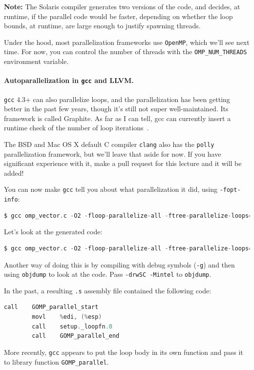 \documentclass[a4paper]{report}
\begin{document}
{\bf Note:} The Solaris compiler generates two versions of the code,
and decides, at runtime, if the parallel code would be faster, depending on
whether the loop bounds, at runtime, are large enough to justify spawning
threads.

Under the hood, most parallelization frameworks use {\tt OpenMP},
which we'll see next time. For now, you can control the number of
threads with the {\tt OMP\_NUM\_THREADS} environment variable.

\paragraph{Autoparallelization in {\tt gcc} and LLVM.}
{\tt gcc} 4.3+ can also parallelize loops, and the parallelization has
been getting better in the past few years, though it's still not super
well-maintained. Its framework is called Graphite. As far as I can
tell, gcc can currently insert a runtime check of the number of loop
iterations~\cite{autopar}.

The BSD and Mac OS X default C compiler {\tt clang} also has the {\tt polly} parallelization framework, but we'll leave that aside for now. If you have significant experience with it, make a pull request for this lecture and it will be added!

You can now make {\tt gcc} tell you about what parallelization it did, using {\tt -fopt-info}:
\begin{lstlisting}[language=C]
$ gcc omp_vector.c -O2 -floop-parallelize-all -ftree-parallelize-loops=2 -fopt-info
\end{lstlisting}
Let's look at the generated code:
\begin{lstlisting}[language=C]
$ gcc omp_vector.c -O2 -floop-parallelize-all -ftree-parallelize-loops=2 -fopt-info -S
\end{lstlisting}
Another way of doing this is by compiling with debug symbols ({\tt -g}) and then using {\tt objdump}
to look at the code. Pass {\tt -drwSC -Mintel} to {\tt objdump}.

In the past, a resulting {\tt .s} assembly file contained the following code:

\begin{lstlisting}[language=C]
        call    GOMP_parallel_start
        movl    %edi, (%esp)
        call    setup._loopfn.0
        call    GOMP_parallel_end
\end{lstlisting}
More recently, {\tt gcc} appears to put the loop
body in its own function and pass it to library function {\tt GOMP\_parallel}.
\end{document}
